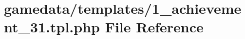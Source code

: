 \hypertarget{1__achievement__31_8tpl_8php}{\section{gamedata/templates/1\+\_\+achievement\+\_\+31.tpl.\+php File Reference}
\label{1__achievement__31_8tpl_8php}
}
